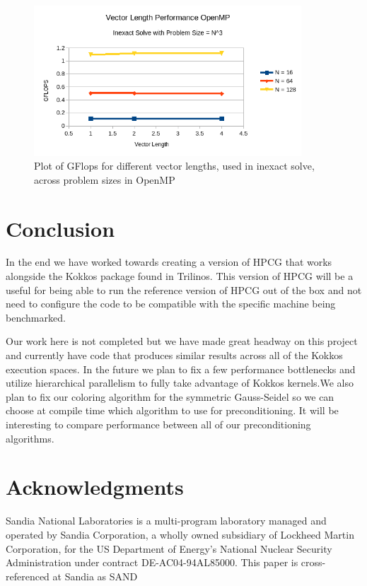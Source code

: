 \documentclass{ccr15}
\begin{document}
\begin{figure}[H]
	\centering
	\includegraphics[width=10cm]{plots/ZAB-VectorLengthOpenMP.png}
	\caption{Plot of GFlops for different vector lengths, used in inexact solve, across problem sizes in OpenMP}
	\label{vlength_openmp}
\end{figure}

\section{Conclusion}
In the end we have worked towards creating a version of HPCG that works alongside the Kokkos
package found in Trilinos. This version of HPCG will be a useful for being able to run the reference
version of HPCG out of the box and not need to configure the code to be compatible with the
specific machine being benchmarked.

Our work here is not completed but we have made great headway on this project and currently have
code that produces similar results across all of the Kokkos execution spaces. In the future we plan to
fix a few performance bottlenecks and utilize hierarchical parallelism to fully take advantage of Kokkos
kernels.We also plan to fix our coloring algorithm for the symmetric Gauss-Seidel so we can choose at
compile time which algorithm to use for preconditioning. It will be interesting to compare performance
between all of our preconditioning algorithms.
\section{Acknowledgments}
Sandia National Laboratories is a multi-program laboratory managed and operated by Sandia Corporation, a wholly owned subsidiary of Lockheed Martin Corporation, for the US Department of Energy{'}s National Nuclear Security Administration under contract DE-AC04-94AL85000. This paper is cross-referenced at Sandia as SAND


\nocite{ZAB:TechHPCG}
\nocite{ZAB:TechHPCG2}
\nocite{ZAB:Kokkos}
\nocite{ZAB:Trilinos}
\nocite{ZAB:Top500}
\nocite{ZAB:CUDA}
\nocite{ZAB:OpenMP}
\nocite{ZAB:PThreads}
\nocite{ZAB:SYMGS}

%
\end{document}
